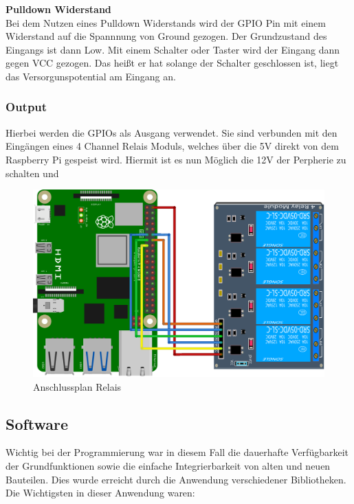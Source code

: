 \textbf{Pulldown Widerstand}\\

Bei dem Nutzen eines Pulldown Widerstands wird der GPIO Pin mit einem Widerstand auf die Spannnung von Ground gezogen. Der Grundzustand des Eingangs ist dann Low. Mit einem Schalter oder Taster wird der Eingang dann gegen VCC gezogen. Das heißt er hat solange der Schalter geschlossen ist, liegt das Versorgunspotential am Eingang an.

\subsubsection{Output}

Hierbei werden die GPIOs als Ausgang verwendet. Sie sind verbunden mit den Eingängen eines 4 Channel Relais Moduls, welches über die 5V direkt von dem Raspberry Pi gespeist wird. Hiermit ist es nun Möglich die 12V der Perpherie zu schalten und 

\begin{figure}[H]
	\begin{center}
		\includegraphics[scale=0.7]{figures/hcis/4ch_relai.png}
			\caption{Anschlussplan Relais}
			\label{fig:output}
	\end{center}
\end{figure}

\subsection{Software}

Wichtig bei der Programmierung war in diesem Fall die dauerhafte Verfügbarkeit der Grundfunktionen  sowie die einfache Integrierbarkeit von alten und neuen Bauteilen. Dies wurde erreicht durch die Anwendung verschiedener Bibliotheken.\\
Die Wichtigsten in dieser Anwendung waren: \\

